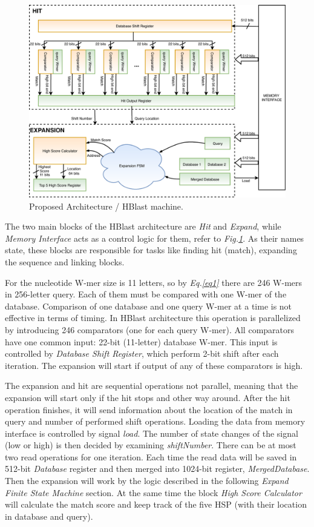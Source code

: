 \begin{figure}[t!]
\centering
\includegraphics[width=\columnwidth]{Figures/BlastMachine.pdf}
\caption{Proposed Architecture / HBlast machine.} \label{fig:blastArch}
\end{figure}

The two main blocks of the HBlast architecture are \textit{Hit} and \textit{Expand}, while \textit{Memory Interface} acts as a control logic for them, refer to \textit{Fig.\ref{fig:blastArch}}. As their names state, these blocks are responsible for tasks like finding hit (match), expanding the sequence and linking blocks. 

For the nucleotide W-mer size is 11 letters, so by \textit{Eq.\ref{eq1}} there are 246 W-mers in 256-letter query. Each of them must be compared with one W-mer of the database.  Comparison of one database and one query W-mer at a time is not effective in terms of timing. In HBlast architecture this operation is parallelized by introducing 246 comparators (one for each query W-mer). All comparators have one common input: 22-bit (11-letter) database W-mer. This input is controlled by \textit{Database Shift Register}, which perform 2-bit shift after each iteration. The expansion will start if output of any of these comparators is high. 



The expansion and hit are sequential operations not parallel, meaning that the expansion will start only if the hit stops and other way around. After the hit operation finishes, it will send information about the location of the match in query and number of performed shift operations. Loading the data from memory interface is controlled by signal \textit{load}. The number of state changes of the signal (low or high) is then decided by examining \textit{shiftNumber}. There can be at most two read operations for one iteration. Each time the read data will be saved in 512-bit \textit{Database} register and then merged into 1024-bit register, \textit{MergedDatabase}. Then the expansion will work by the logic described in the following \textit{Expand Finite State Machine} section. 
At the same time the block \textit{High Score Calculator} will calculate the match score and keep track of the five HSP (with their location in database and query).    



